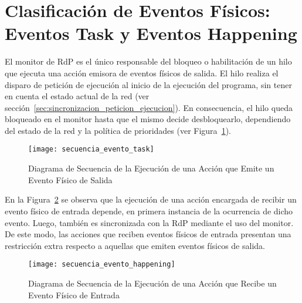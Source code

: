 \section{Clasificación de Eventos Físicos: \\ Eventos Task y Eventos Happening}
\label{sec:clasificacion_eventos_fisicos} 

El monitor de RdP es el único responsable del bloqueo o habilitación de un hilo
que ejecuta una acción emisora de eventos físicos de salida. El hilo realiza el
disparo de petición de ejecución al inicio de la ejecución del programa, sin
tener en cuenta el estado actual de la red (ver
sección~\ref{sec:sincronizacion_peticion_ejecucion}). En consecuencia, el hilo
queda bloqueado en el monitor hasta que el mismo decide desbloquearlo,
dependiendo del estado de la red y la política de prioridades (ver
Figura~\ref{fig:actividades_evento_task}).

\begin{figure}[H]
	\centering
	\texttt{[image: secuencia\_evento\_task]}
	\caption{Diagrama de Secuencia de la Ejecución de una Acción que Emite un
	Evento Físico de Salida}
	\label{fig:actividades_evento_task}
\end{figure}

En la Figura~\ref{fig:actividades_evento_happening} se observa que
la ejecución de una acción encargada de recibir un evento físico de entrada
depende, en primera instancia de la ocurrencia de dicho evento. Luego, también
es sincronizada con la RdP mediante el uso del monitor. De este modo, las
acciones que reciben eventos físicos de entrada presentan una restricción extra
respecto a aquellas que emiten eventos físicos de salida.



\begin{figure}[H]
	\centering
	\texttt{[image: secuencia\_evento\_happening]}
	\caption{Diagrama de Secuencia de la Ejecución de una Acción que Recibe un
	Evento Físico de Entrada}
	\label{fig:actividades_evento_happening}
\end{figure}

